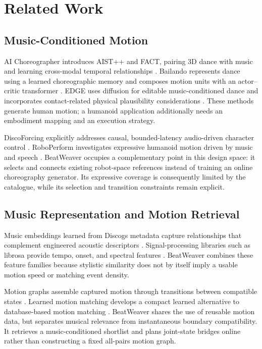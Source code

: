 \documentclass[conference]{IEEEtran}
\begin{document}
\section{Related Work}
\subsection{Music-Conditioned Motion}
AI Choreographer introduces AIST++ and FACT, pairing 3D dance with music and
learning cross-modal temporal relationships \cite{li2021ai}. Bailando
represents dance using a learned choreographic memory and composes motion
units with an actor--critic transformer \cite{siyao2022bailando}. EDGE uses
diffusion for editable music-conditioned dance and incorporates contact-related
physical plausibility considerations \cite{tseng2023edge}. These methods
generate human motion; a humanoid application additionally needs an embodiment
mapping and an execution strategy.

DiscoForcing explicitly addresses causal, bounded-latency audio-driven
character control \cite{ji2026discoforcing}. RoboPerform investigates
expressive humanoid motion driven by music and speech \cite{li2026you}.
BeatWeaver occupies a complementary point in this design space: it selects and
connects existing robot-space references instead of training an online
choreography generator. Its expressive coverage is consequently limited by
the catalogue, while its selection and transition constraints remain explicit.

\subsection{Music Representation and Motion Retrieval}
Music embeddings learned from Discogs metadata capture relationships that
complement engineered acoustic descriptors \cite{alonso2022music}.
Signal-processing libraries such as librosa provide tempo, onset, and spectral
features \cite{mcfee2015librosa}. BeatWeaver combines these feature families
because stylistic similarity does not by itself imply a usable motion speed
or matching event density.

Motion graphs assemble captured motion through transitions between compatible
states \cite{kovar2023motion}. Learned motion matching develops a compact
learned alternative to database-based motion matching
\cite{holden2020learned}. BeatWeaver shares the use of reusable motion data,
but separates musical relevance from instantaneous boundary compatibility.
It retrieves a music-conditioned shortlist and plans joint-state bridges
online rather than constructing a fixed all-pairs motion graph.
\end{document}
